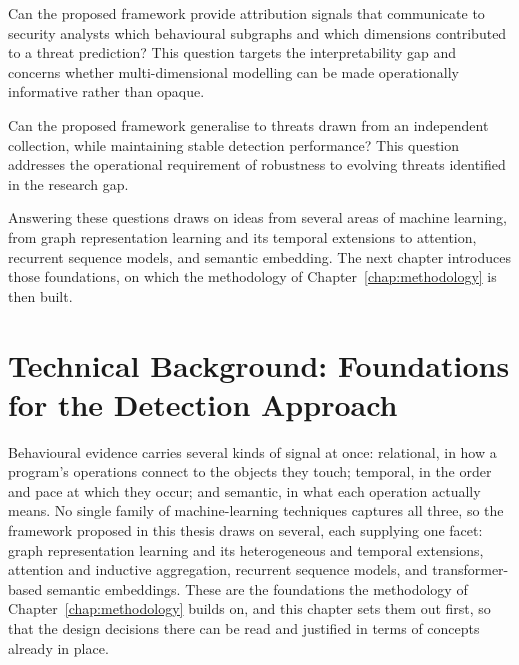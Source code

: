 \documentclass[%
    BCOR=10mm,
    DIV=13,
    toc=bibliography,
    toc=listof,
    oneside,
    12pt,
]{scrbook}
\begin{document}
\begin{description}[leftmargin=0pt, labelwidth=0pt, labelsep=\parskip, style=nextline]
\item[\textbf{RQ4 -- Model Interpretability.}]
Can the proposed framework provide attribution signals that communicate to
security analysts which behavioural subgraphs and which dimensions contributed
to a threat prediction? This question targets the interpretability gap and
concerns whether multi-dimensional modelling can be made operationally
informative rather than opaque.

\item[\textbf{RQ5 -- Cross-Source Generalisation.}]
Can the proposed framework generalise to threats drawn from an independent
collection, while maintaining stable detection performance? This question
addresses the operational requirement of robustness to evolving threats
identified in the research gap.

\end{description}

Answering these questions draws on ideas from several areas of machine learning,
from graph representation learning and its temporal extensions to attention,
recurrent sequence models, and semantic embedding. The next chapter introduces
those foundations, on which the methodology of Chapter~\ref{chap:methodology} is
then built.

\chapter{Technical Background: Foundations for the Detection Approach}
\label{chap:theory}

Behavioural evidence carries several kinds of signal at once: relational, in how
a program's operations connect to the objects they touch; temporal, in the order
and pace at which they occur; and semantic, in what each operation actually
means. No single family of machine-learning techniques captures all three, so the
framework proposed in this thesis draws on several, each supplying one facet:
graph representation learning and its heterogeneous and temporal extensions,
attention and inductive aggregation, recurrent sequence models, and
transformer-based semantic embeddings. These are the foundations the methodology
of Chapter~\ref{chap:methodology} builds on, and this chapter sets them out first,
so that the design decisions there can be read and justified in terms of concepts
already in place.
\end{document}
